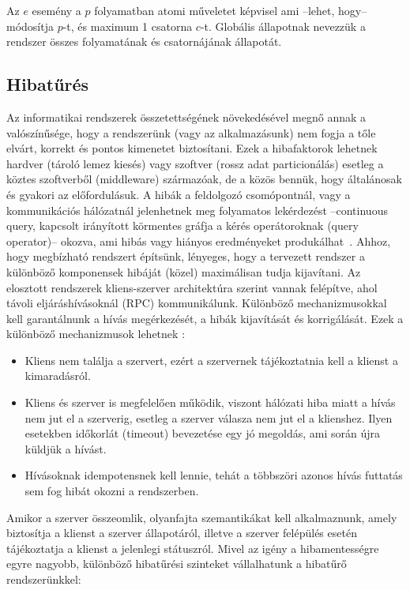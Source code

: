 \documentclass[a4paper,12pt]{article}
\begin{document}
Az $e$ esemény a $p$ folyamatban atomi műveletet képvisel ami --lehet, hogy-- módosítja $p$-t, és maximum 1 csatorna $c$-t. Globális állapotnak nevezzük a rendszer összes folyamatának és csatornájának állapotát. \newline


\subsection{Hibatűrés}

Az informatikai rendszerek összetettségének növekedésével megnő annak a valószínűsége, hogy a rendszerünk (vagy az alkalmazásunk) nem fogja a tőle elvárt, korrekt és pontos kimenetet biztosítani. Ezek a hibafaktorok lehetnek hardver (tároló lemez kiesés) vagy szoftver (rossz adat particionálás) esetleg a köztes szoftverből (middleware) származóak, de a közös bennük, hogy általánosak és gyakori az előfordulásuk.  A hibák a feldolgozó csomópontnál, vagy a kommunikációs hálózatnál jelenhetnek meg folyamatos lekérdezést --continuous query, kapcsolt irányított körmentes gráfja a kérés operátoroknak (query operator)-- okozva, ami hibás vagy hiányos eredményeket produkálhat~\cite{balazinska}. Ahhoz, hogy megbízható rendszert építsünk, lényeges, hogy a tervezett rendszer a különböző komponensek hibáját (közel) maximálisan tudja kijavítani. Az elosztott rendszerek kliens-szerver architektúra szerint vannak felépítve, ahol távoli eljáráshívásoknál (RPC) kommunikálunk. Különböző mechanizmusokkal kell garantálnunk a hívás megérkezését, a hibák kijavítását és korrigálását. Ezek a különböző mechanizmusok lehetnek \cite{szemantika}:

\begin{itemize}
\item Kliens nem találja a szervert, ezért a szervernek tájékoztatnia kell a klienst a kimaradásról.
\item Kliens és szerver is megfelelően működik, viszont hálózati hiba miatt a hívás nem jut el a szerverig, esetleg a szerver válasza nem jut el a klienshez. Ilyen esetekben időkorlát (timeout) bevezetése egy jó megoldás, ami során újra küldjük a hívást.
\item Hívásoknak idempotensnek kell lennie, tehát a többszöri azonos hívás futtatás sem fog hibát okozni a rendszerben.
\end{itemize}

Amikor a szerver összeomlik, olyanfajta szemantikákat kell alkalmaznunk, amely biztosítja a klienst a szerver állapotáról, illetve a szerver felépülés esetén tájékoztatja a klienst a jelenlegi státuszról. \newline
Mivel az igény a hibamentességre egyre nagyobb, különböző hibatűrési szinteket vállalhatunk a hibatűrő rendszerünkkel: \cite{akka}
\end{document}

